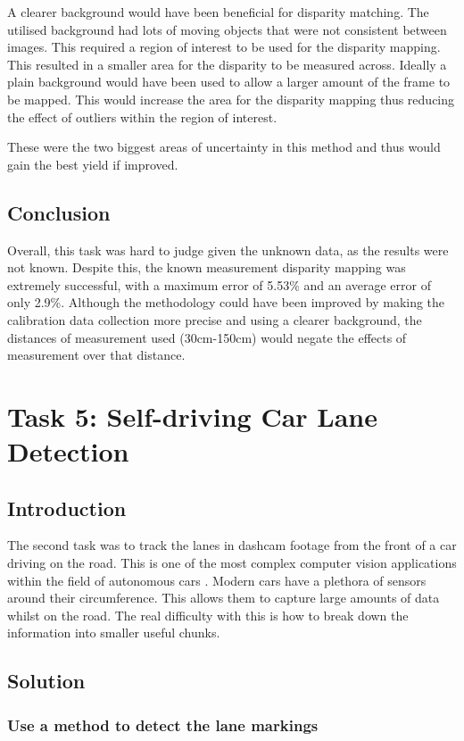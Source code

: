 \documentclass[conference]{IEEEtran}
\begin{document}
A clearer background would have been beneficial for disparity matching. The utilised background had lots of moving objects that were not consistent between images. This required a region of interest to be used for the disparity mapping. This resulted in a smaller area for the disparity to be measured across. Ideally a plain background would have been used to allow a larger amount of the frame to be mapped. This would increase the area for the disparity mapping thus reducing the effect of outliers within the region of interest. 

These were the two biggest areas of uncertainty in this method and thus would gain the best yield if improved. 

\subsection{Conclusion}
Overall, this task was hard to judge given the unknown data, as the results were not known. Despite this, the known measurement disparity mapping was extremely successful, with a maximum error of 5.53\% and an average error of only 2.9\%. Although the methodology could have been improved by making the calibration data collection more precise and using a clearer background, the distances of measurement used (30cm-150cm) would negate the effects of measurement over that distance. 

\section{Task 5: Self-driving Car Lane Detection}
\subsection{Introduction}

The second task was to track the lanes in dashcam footage from the front of a car driving on the road. This is one of the most complex computer vision applications within the field of autonomous cars \cite{Hajare2016AVB}. Modern cars have a plethora of sensors around their circumference. This allows them to capture large amounts of data whilst on the road. The real difficulty with this is how to break down the information into smaller useful chunks.  

\subsection{Solution}

\subsubsection{Use a method to detect the lane markings}
\end{document}
